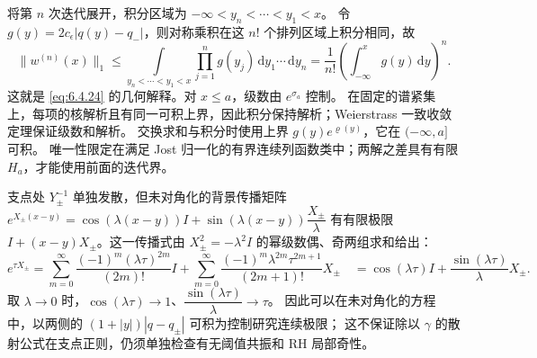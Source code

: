 \documentclass[lang=cn,scheme=chinese,mode=simple,device=normal,color=blue,
math=cm,thmcnt=section,12pt]{elegantbook}
\newcommand{\dd}{\,\mathrm{d}}
\begin{document}
\begin{callout}
    将第 $n$ 次迭代展开，积分区域为
    $-\infty<y_n<\cdots<y_1<x$。
    令 $g(y)=2c_\epsilon|q(y)-q_-|$，则对称乘积在这 $n!$ 个排列区域上积分相同，故
    \[
        \|w^{(n)}(x)\|_1\le
        \int\limits_{y_n<\cdots<y_1<x}\prod\limits_{j=1}^n g(y_j)\dd y_1\cdots\dd y_n
        =\dfrac{1}{n!}\left(\int_{-\infty}^x g(y)\dd y\right)^n.
    \]
    这就是 \eqref{eq:6.4.24} 的几何解释。对 $x\le a$，级数由 $e^{\sigma_a}$ 控制。
    在固定的谱紧集上，每项的核解析且有同一可积上界，因此积分保持解析；Weierstrass 一致收敛定理保证级数和解析。
    交换求和与积分时使用上界 $g(y)e^{\varrho(y)}$，它在 $(-\infty,a\rbrack$ 可积。
    唯一性限定在满足 Jost 归一化的有界连续列函数类中；两解之差具有有限 $H_a$，才能使用前面的迭代界。

    支点处 $Y_\pm^{-1}$ 单独发散，但未对角化的背景传播矩阵
    $e^{X_\pm(x-y)}=\cos(\lambda(x-y))I+\sin(\lambda(x-y))\dfrac{X_\pm}{\lambda}$
    有有限极限 $I+(x-y)X_\pm$。这一传播式由 $X_\pm^2=-\lambda^2I$ 的幂级数偶、奇两组求和给出：
    \[
        e^{\tau X_\pm}
        =\sum\limits_{m=0}^\infty\dfrac{(-1)^m(\lambda\tau)^{2m}}{(2m)!}I
        +\sum\limits_{m=0}^\infty\dfrac{(-1)^m\lambda^{2m}\tau^{2m+1}}{(2m+1)!}X_\pm\quad
        =\cos(\lambda\tau)I+\dfrac{\sin(\lambda\tau)}{\lambda}X_\pm.
    \]
    取 $\lambda\to0$ 时，$\cos(\lambda\tau)\to1$、$\dfrac{\sin(\lambda\tau)}{\lambda}\to\tau$。
    因此可以在未对角化的方程中，以两侧的 $(1+|y|)|q-q_\pm|$ 可积为控制研究连续极限；
    这不保证除以 $\gamma$ 的散射公式在支点正则，仍须单独检查有无阈值共振和 RH 局部奇性。
\end{callout}
\end{document}
